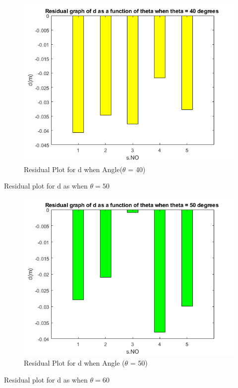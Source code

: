 \begin{figure}[h!]
    \centering
    \includegraphics[width=\textwidth]{figures/d_A2_r.png}
    \caption{   Residual Plot for d when Angle($\theta$ = 40)}
    \label{fig:yx}
\end{figure}
\newpage 
Residual plot for d as when $\theta = 50 $
\begin{figure}[h!]
    \centering
    \includegraphics[width=\textwidth]{figures/d_A3_r.png}
    \caption{Residual Plot for  d when Angle ($\theta$ = 50)}
    \label{fig:yx}
\end{figure}
\newpage 
Residual plot for d as when $\theta = 60 $
